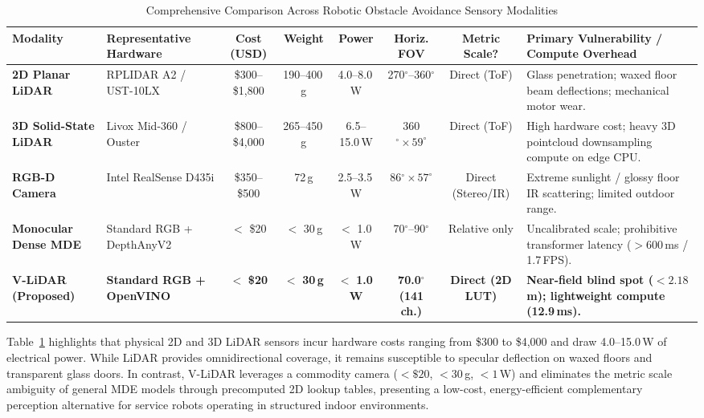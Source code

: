 \documentclass{ieeeaccess}
\begin{document}
\begin{table}[!t]
  \centering
  \footnotesize
  \caption{Comprehensive Comparison Across Robotic Obstacle Avoidance Sensory Modalities}
  \label{tab:sensory_comparison}
  \begin{tabularx}{\textwidth}{@{}p{2.2cm}p{2.4cm}cccccX@{}}
    \toprule
    Modality & Representative Hardware & Cost (USD) & Weight & Power & Horiz. FOV & Metric Scale? & Primary Vulnerability / Compute Overhead \\
    \midrule
    \textbf{2D Planar LiDAR} & RPLIDAR A2 / UST-10LX & \$300--\$1,800 & 190--400\,g & 4.0--8.0\,W & 270$^\circ$--360$^\circ$ & Direct (ToF) & Glass penetration; waxed floor beam deflections; mechanical motor wear. \\
    \textbf{3D Solid-State LiDAR} & Livox Mid-360 / Ouster & \$800--\$4,000 & 265--450\,g & 6.5--15.0\,W & 360$^\circ \times 59^\circ$ & Direct (ToF) & High hardware cost; heavy 3D pointcloud downsampling compute on edge CPU. \\
    \textbf{RGB-D Camera} & Intel RealSense D435i & \$350--\$500 & 72\,g & 2.5--3.5\,W & 86$^\circ \times 57^\circ$ & Direct (Stereo/IR) & Extreme sunlight / glossy floor IR scattering; limited outdoor range. \\
    \textbf{Monocular Dense MDE} & Standard RGB + DepthAnyV2 & $<$ \$20 & $<$ 30\,g & $<$ 1.0\,W & 70$^\circ$--90$^\circ$ & Relative only & Uncalibrated scale; prohibitive transformer latency ($>600$\,ms / 1.7\,FPS). \\
    \textbf{V-LiDAR (Proposed)} & \textbf{Standard RGB + OpenVINO} & $<$ \textbf{\$20} & $<$ \textbf{30\,g} & $<$ \textbf{1.0\,W} & \textbf{70.0$^\circ$ (141 ch.)} & \textbf{Direct (2D LUT)} & \textbf{Near-field blind spot ($<2.18$\,m); lightweight compute (12.9\,ms).} \\
    \bottomrule
  \end{tabularx}
\end{table}

Table~\ref{tab:sensory_comparison} highlights that physical 2D and 3D LiDAR sensors incur hardware costs ranging from \$300 to \$4,000 and draw 4.0--15.0\,W of electrical power. While LiDAR provides omnidirectional coverage, it remains susceptible to specular deflection on waxed floors and transparent glass doors. In contrast, V-LiDAR leverages a commodity camera ($<\$20$, $<30$\,g, $<1$\,W) and eliminates the metric scale ambiguity of general MDE models through precomputed 2D lookup tables, presenting a low-cost, energy-efficient complementary perception alternative for service robots operating in structured indoor environments.
\end{document}
